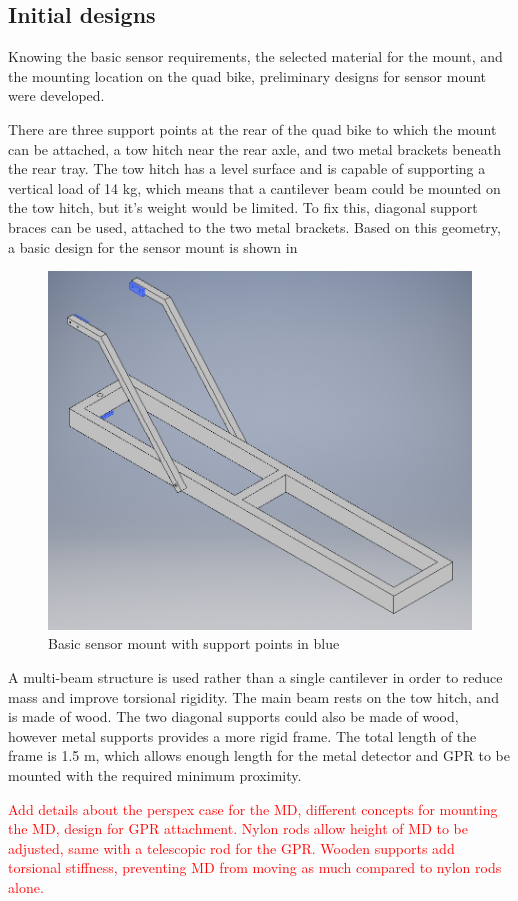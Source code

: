 \documentclass[main.tex]{subfiles}
\begin{document}
\subsection{Initial designs}
Knowing the basic sensor requirements, the selected material for the mount, and the mounting location on the quad bike, preliminary designs for sensor mount were developed. 

There are three support points at the rear of the quad bike to which the mount can be attached, a tow hitch near the rear axle, and two metal brackets beneath the rear tray. The tow hitch has a level surface and is capable of supporting a vertical load of 14 kg, which means that a cantilever beam could be mounted on the tow hitch, but it's weight would be limited. To fix this, diagonal support braces can be used, attached to the two metal brackets. Based on this geometry, a basic design for the sensor mount is shown in 

\begin{figure}[ht]
\includegraphics[width=.6\textwidth]{3-ConceptDesign/basic.PNG}
\centering
\caption{Basic sensor mount with support points in blue}
\end{figure}

A multi-beam structure is used rather than a single cantilever in order to reduce mass and improve torsional rigidity. The main beam rests on the tow hitch, and is made of wood. The two diagonal supports could also be made of wood, however metal supports provides a more rigid frame. The total length of the frame is 1.5 m, which allows enough length for the metal detector and GPR to be mounted with the required minimum proximity. 

\textcolor{red}{Add details about the perspex case for the MD, different concepts for mounting the MD, design for GPR attachment. Nylon rods allow height of MD to be adjusted, same with a telescopic rod for the GPR. Wooden supports add torsional stiffness, preventing MD from moving as much compared to nylon rods alone. }
\end{document}
